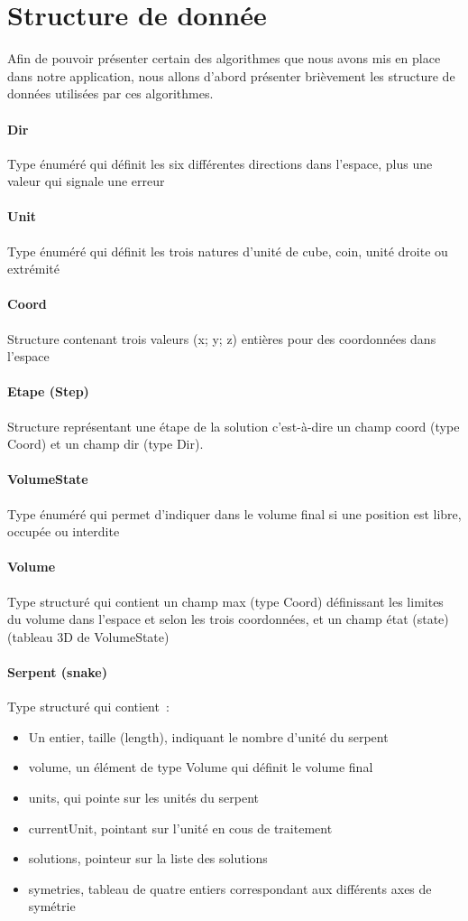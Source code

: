 \section{Structure de donnée}
Afin de pouvoir présenter certain des algorithmes que nous avons mis en place dans notre application, nous allons d'abord présenter brièvement les structure de données utilisées par ces algorithmes.

\paragraph{Dir} Type énuméré qui définit les six différentes directions dans l’espace, plus une valeur qui signale une erreur
\paragraph{Unit} Type énuméré qui définit les trois natures d’unité de cube, coin, unité droite ou extrémité
\paragraph{Coord} Structure contenant trois valeurs (x; y; z) entières pour des coordonnées dans l’espace
\paragraph{Etape (Step)} Structure représentant une étape de la solution c’est-à-dire un champ coord (type Coord) et un champ dir (type Dir).
\paragraph{VolumeState} Type énuméré qui permet d’indiquer dans le volume final si une position est libre, occupée ou interdite
\paragraph{Volume} Type structuré qui contient un champ max (type Coord) définissant les limites du volume dans l’espace et selon les trois coordonnées, et un champ état (state) (tableau 3D de VolumeState)
\paragraph{Serpent (snake)} Type structuré qui contient : 
\begin{itemize}
 \item Un entier, taille (length), indiquant le nombre d’unité du serpent 
 \item volume, un élément de type Volume qui définit le volume final
 \item units, qui pointe sur les unités du serpent 
 \item currentUnit, pointant sur l’unité en cous de traitement 
 \item solutions, pointeur sur la liste des solutions 
 \item symetries, tableau de quatre entiers correspondant aux différents axes de symétrie
\end{itemize}
